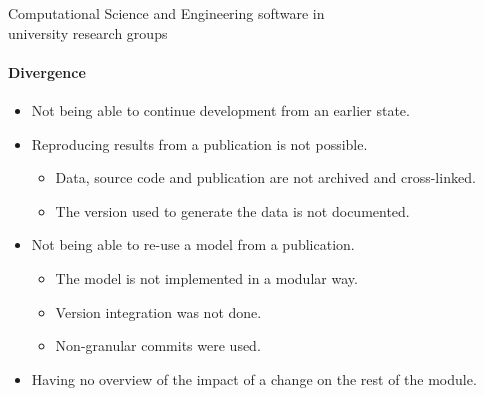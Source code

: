 \documentclass[
	aspectratio=169,%
	color={accentcolor=2d},
	logo=true,%
	colorframetitle=true,%
	]{tudabeamer}
\begin{document}
\begin{frame}{Computational Science and Engineering software in\\university research groups}
	\framesubtitle{Divergence}
	
	\vfill
	\begin{itemize}
            \item Not being able to continue development from an earlier state.
            \item Reproducing results from a publication is not possible.  
                \begin{itemize}
                    \item Data, source code and publication are not archived and cross-linked. 
                    \item The version used to generate the data is not documented. 
                \end{itemize}
            \item Not being able to re-use a model from a publication. 
                \begin{itemize}
                    \item The model is not implemented in a modular way.
                    \item Version integration was not done.
                    \item Non-granular commits were used. 
                \end{itemize}
            \item Having no overview of the impact of a change on the rest of the module.
	\end{itemize}

	\medskip

\end{frame}



\end{document}
